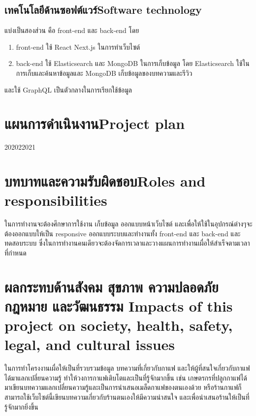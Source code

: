 \subsection{\ifcpe เทคโนโลยีด้านซอฟต์แวร์\else Software technology\fi}
แบ่งเป็นสองส่วน คือ front-end และ back-end โดย
\begin{enumerate}
    \item front-end ใช้ React Next.js ในการทำเว็บไซต์
    \item back-end ใช้ Elasticsearch และ MongoDB ในการเก็บข้อมูล โดย Elasticsearch ใช้ในการเก็บและค้นหาข้อมูลและ MongoDB เก็บข้อมูลของบทความและรีวิว
\end{enumerate}
และใช้ GraphQL เป็นตัวกลางในการเรียกใช้ข้อมูล

\section{\ifcpe แผนการดำเนินงาน\else Project plan\fi}

\begin{plan}{6}{2020}{2}{2021}
\end{plan}

\section{\ifcpe บทบาทและความรับผิดชอบ\else Roles and responsibilities\fi}
ในการทำงานจะต้องศึกษาการใช้งาน เก็บข้อมูล ออกแบบหน้าเว็บไซต์ และเพื่อให้ใช้ในอุปกรณ์ต่างๆจะต้องออกแบบให้เป็น responsive ออกแบบระบบและทำงานทั้ง front-end และ back-end และทดสอบระบบ ซึ่งในการทำงานคนเดียวจะต้องจัดการเวลาและวางแผนการทำงานเผื่อให้สำเร็จตามเวลาที่กำหนด

\section{\ifcpe%
ผลกระทบด้านสังคม สุขภาพ ความปลอดภัย กฎหมาย และวัฒนธรรม
\else%
Impacts of this project on society, health, safety, legal, and cultural issues
\fi}
ในการทำโครงงานเผื่อให้เป็นที่รวบรวมข้อมูล บทความที่เกี่ยวกับกาแฟ และให้ผู้ที่สนใจเกี่ยวกับกาแฟได้มาแลกเปลี่ยนความรู้ ทำให้วงการกาแฟเติบโตและเป็นที่รู้จักมากขึ้น เช่น เกษตรกรที่ปลูกกาแฟได้มาเขียนบทความแลกเปลี่ยนความรู้และเป็นการนำเสนอเมล็ดกาแฟของตนเองด้วย หรือร้านกาแฟก็สามารถใช้เว็บไซต์นี้เขียนบทความเกี่ยวกับร้านตนเองให้มีความน่าสนใจ และเพื่อนำเสนอร้านให้เป็นที่รู้จักมากยิ่งขึ้น